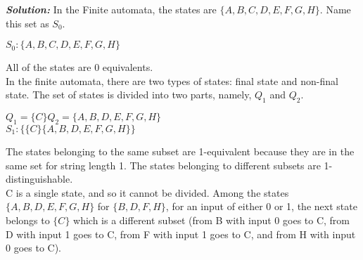 \documentclass[a4,9pt]{beamer}
\begin{document}
\begin{frame}
\emph{\textbf{Solution:}} In the Finite automata, the states are $\{A, B, C, D, E, F, G, H\}$. Name this set as $S_0$.\\

\pause
\begin{center}
$S_0: \{A, B, C, D, E, F, G, H\}$
\end{center}

\vspace*{0.1cm}
\hspace*{0.2cm} All of the states are 0 equivalents.\\
In the finite automata, there are two types of states: final state and non-final state. The set of states is
divided into two parts, namely, $Q_1$ and $Q_2$.

\pause
\begin{center}
  $Q_1 = \{C\} Q_2 = \{A, B, D, E, F, G, H\}$ \\
  $S_1: \{\{C\} \{A, B, D, E, F, G, H\}\}$
\end{center}

\pause
\small{
The states belonging to the same subset are 1-equivalent because they are in the same set for string
length 1. The states belonging to different subsets are 1-distinguishable.\\
\hspace*{0.2cm} C is a single state, and so it cannot be divided. Among the states $\{A, B, D, E, F, G, H\}$ for $\{B, D, F, H\}$,
for an input of either 0 or 1, the next state belongs to $\{C\}$ which is a different subset (from B with input 0
goes to C, from D with input 1 goes to C, from F with input 1 goes to C, and from H with input 0 goes to C).}
\end{frame}
\end{document}
